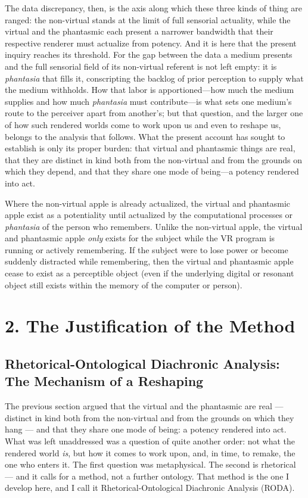 \documentclass{article}
\begin{document}
The data discrepancy, then, is the axis along which these three kinds of thing are ranged: the non-virtual stands at the limit of full sensorial actuality, while the virtual and the phantasmic each present a narrower bandwidth that their respective renderer must actualize from potency. And it is here that the present inquiry reaches its threshold. For the gap between the data a medium presents and the full sensorial field of its non-virtual referent is not left empty: it is \textit{phantasia} that fills it, conscripting the backlog of prior perception to supply what the medium withholds. How that labor is apportioned—how much the medium supplies and how much \textit{phantasia} must contribute—is what sets one medium's route to the perceiver apart from another's; but that question, and the larger one of how such rendered worlds come to work upon us and even to reshape us, belongs to the analysis that follows. What the present account has sought to establish is only its proper burden: that virtual and phantasmic things are real, that they are distinct in kind both from the non-virtual and from the grounds on which they depend, and that they share one mode of being—a potency rendered into act.

Where the non-virtual apple is already actualized, the virtual and phantasmic apple exist as a potentiality until actualized by the computational processes or \textit{phantasia} of the person who remembers. Unlike the non-virtual apple, the virtual and phantasmic apple \textit{only} exists for the subject while the VR program is running or actively remembering. If the subject were to lose power or become suddenly distracted while remembering, then the virtual and phantasmic apple cease to exist as a perceptible object (even if the underlying digital or resonant object still exists within the memory of the computer or person).

\bigskip

\section*{2. The Justification of the Method}

\subsection*{Rhetorical-Ontological Diachronic Analysis: The Mechanism of a Reshaping}

The previous section argued that the virtual and the phantasmic are real — distinct in kind both from the non-virtual and from the grounds on which they hang — and that they share one mode of being: a potency rendered into act. What was left unaddressed was a question of quite another order: not what the rendered world \textit{is}, but how it comes to work upon, and, in time, to remake, the one who enters it. The first question was metaphysical. The second is rhetorical — and it calls for a method, not a further ontology. That method is the one I develop here, and I call it Rhetorical-Ontological Diachronic Analysis (RODA).
\end{document}
